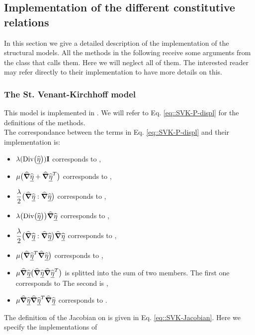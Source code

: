 \subsection{Implementation of the different constitutive relations} In
this section we give a detailed description of the implementation of
the structural models. All the methods in the following receive some
arguments from the class that calls them. Here we will neglect all of
them. The interested reader may refer directly to their implementation
to have more details on this.


\subsubsection{The St. Venant-Kirchhoff model} This model is
implemented in . We will
refer to Eq. \eqref{eq::SVK-P-displ} for the definitions of the
methods.\\ The correspondance between the terms in
Eq. \eqref{eq::SVK-P-displ} and their implementation is:
\begin{itemize}
  \item $\displaystyle \lambda(\text{Div}\big(\widehat{\underline{\eta}}\big))\textbf{I}$ corresponds to
,
  \item $\displaystyle \mu\big(\widehat{\boldsymbol{\nabla}}\widehat{\underline{\eta}} + \widehat{\boldsymbol{\nabla}}\widehat{\underline{\eta}}^T\big)$
corresponds to ,
  \item $\displaystyle
\frac{\lambda}{2}\big(\widehat{\boldsymbol{\nabla}}\widehat{\underline{\eta}}:\widehat{\boldsymbol{\nabla}}\widehat{\underline{\eta}}\big)$ corresponds to
,
  \item $\displaystyle \lambda\big(\text{Div}\big(\widehat{\underline{\eta}}\big)\big)\widehat{\boldsymbol{\nabla}}\widehat{\underline{\eta}}$
corresponds to ,
  \item $\displaystyle
\frac{\lambda}{2}\big(\widehat{\boldsymbol{\nabla}}\widehat{\underline{\eta}}:\widehat{\boldsymbol{\nabla}}\widehat{\underline{\eta}}\big)\widehat{\boldsymbol{\nabla}}\widehat{\underline{\eta}}$
corresponds to ,
  \item $\displaystyle \mu\big(\widehat{\boldsymbol{\nabla}}\widehat{\underline{\eta}}^T \widehat{\boldsymbol{\nabla}}\widehat{\underline{\eta}}\big)$
corresponds to ,
  \item $\displaystyle
\mu\widehat{\boldsymbol{\nabla}}\widehat{\underline{\eta}}\big(\widehat{\boldsymbol{\nabla}}\widehat{\underline{\eta}}\widehat{\boldsymbol{\nabla}}\widehat{\underline{\eta}}^T\big)$ is splitted
into the sum of two members. The first one corresponds to
 The second is
,
  \item $\displaystyle \mu\widehat{\boldsymbol{\nabla}}\widehat{\underline{\eta}}\widehat{\boldsymbol{\nabla}}\widehat{\underline{\eta}}^T\widehat{\boldsymbol{\nabla}}\widehat{\underline{\eta}}$
corresponds to .
\end{itemize} The definition of the Jacobian on \Piola is given in
Eq. \eqref{eq::SVK-Jacobian}. Here we specify the implementations of
